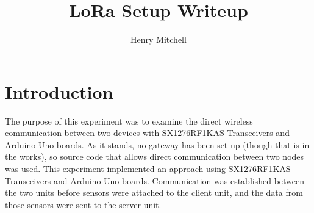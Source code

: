 \documentclass[11pt,onecolumn]{IEEEtran}
\author{Henry Mitchell}
\title{LoRa Setup Writeup}
\date{}
\begin{document}
\maketitle
\section{Introduction}
\label{sec:intro}
The purpose of this experiment was to examine the direct wireless communication between two devices with SX1276RF1KAS Transceivers and Arduino Uno boards.
As it stands, no gateway has been set up (though that is in the works), so source code that allows direct communication between two nodes was used.
This experiment implemented an approach using SX1276RF1KAS Transceivers and Arduino Uno boards.
Communication was established between the two units before sensors were attached to the client unit, and the data from those sensors were sent to the server unit.
\end{document}
